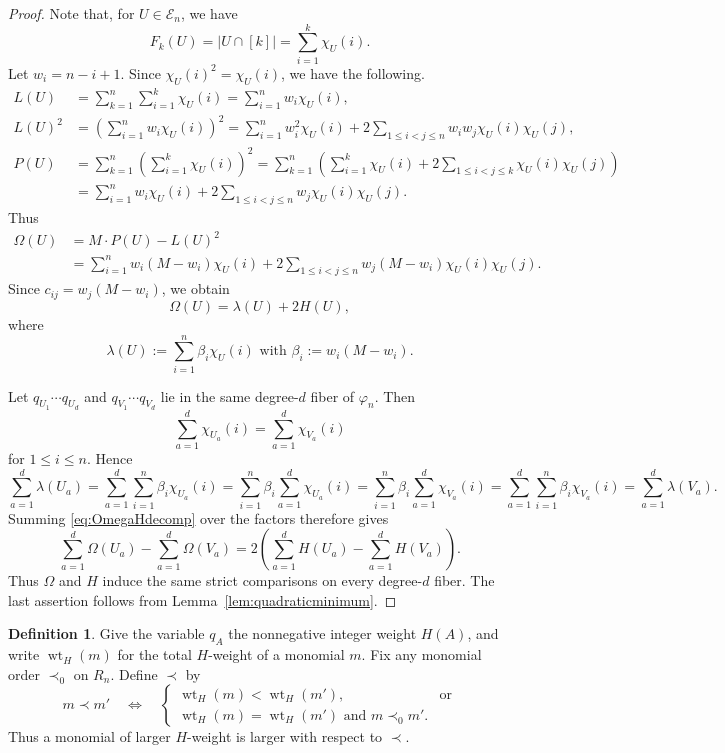 \documentclass[11pt]{amsart}
\theoremstyle{definition}
\newtheorem{definition}[theorem]{Definition}
\newcommand{\En}{\mathcal E_n}
\newcommand{\wt}{\operatorname{wt}}
\numberwithin{equation}{section}
\begin{document}
\begin{proof}
Note that, for $U\in\En$, we have
\[
F_k(U)= |U \cap [k]|=\sum_{i=1}^k \chi_U(i).
\]
Let $w_i=n-i+1$. 
Since \(\chi_U(i)^2=\chi_U(i)\), we have the following.
\[
 \begin{aligned}
 L(U)&=\sum_{k=1}^n \sum_{i=1}^k  \chi_U(i)=\sum_{i=1}^n w_i\chi_U(i),\\
L(U)^2
&=\left(\sum_{i=1}^n w_i\chi_U(i)\right)^2
=\sum_{i=1}^n w_i^2\chi_U(i)
 +2\sum_{1\le i<j\le n}
 w_iw_j\chi_U(i)\chi_U(j),\\
P(U)&=\sum_{k=1}^n \left(\sum_{i=1}^k  \chi_U(i)\right)^2 
=\sum_{k=1}^n \left(
\sum_{i=1}^k \chi_U(i)+2\sum_{1\le i<j \le k}\chi_U(i)\chi_U(j)
\right)\\
&=\sum_{i=1}^n w_i\chi_U(i)+2\sum_{1\le i<j \le n}w_j\chi_U(i)\chi_U(j).
 \end{aligned}
\]
Thus
$$
\begin{aligned}
\Omega(U)
&=M \cdot P(U)-L(U)^2\\
&=\sum_{i=1}^n w_i(M-w_i)\chi_U(i) +2\sum_{1\le i<j\le n}
 w_j(M-w_i)\chi_U(i)\chi_U(j).
\end{aligned}
$$
Since \(c_{ij}=w_j(M-w_i)\), we obtain
\begin{equation}\label{eq:OmegaHdecomp}
\Omega(U)=\lambda(U)+2H(U),
\end{equation}
where
\[\lambda(U):=\sum_{i=1}^n \beta_i \chi_U(i)
\mbox{ with } \beta_i:=  w_i(M-w_i).\]

Let $q_{U_1}\cdots q_{U_d}$ and $q_{V_1}\cdots q_{V_d}$ lie in the same degree-$d$ fiber of $\varphi_n$. 
Then 
\[\sum_{a=1}^d\chi_{U_a}(i)=\sum_{a=1}^d\chi_{V_a}(i)\]
for $1\le i\le n$.
Hence
\[
\sum_{a=1}^d\lambda(U_a)
= \sum_{a=1}^d \sum_{i=1}^n \beta_i \chi_{U_a}(i)
=  \sum_{i=1}^n \beta_i \sum_{a=1}^d \chi_{U_a}(i)
=  \sum_{i=1}^n \beta_i \sum_{a=1}^d \chi_{V_a}(i)
= \sum_{a=1}^d \sum_{i=1}^n \beta_i\chi_{V_a}(i)
=\sum_{a=1}^d\lambda(V_a).
\]
Summing \eqref{eq:OmegaHdecomp} over the factors therefore gives
\[
 \sum_{a=1}^d\Omega(U_a)-\sum_{a=1}^d\Omega(V_a)
=2\left(\sum_{a=1}^d H(U_a)-\sum_{a=1}^d H(V_a)\right).
\]
Thus $\Omega$ and $H$ induce the same strict comparisons on every degree-$d$ fiber. The last assertion follows from Lemma~\ref{lem:quadraticminimum}.
\end{proof}

\begin{definition} \label{def:order}
Give the variable $q_A$ the nonnegative integer weight $H(A)$, and write $\wt_H(m)$ for the total $H$-weight of a monomial $m$. Fix any monomial order $\prec_0$ on $R_n$. Define $\prec$ by
\begin{equation}\label{mono_order}
 m\prec m'
 \quad\Longleftrightarrow\quad
 \begin{cases}
 \wt_H(m)<\wt_H(m'),&\text{or}\\
 \wt_H(m)=\wt_H(m')\text{ and }m\prec_0m'.
 \end{cases}    
\end{equation}
Thus a monomial of larger $H$-weight is larger with respect to $\prec$.
\end{definition}
\end{document}
